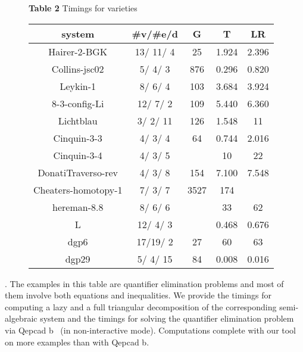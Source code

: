 \documentclass{sig-alternate}
\def\L {\ensuremath{\mathbb{L}}}
\begin{document}
\begin{figure}
\centering
{\textbf{Table 2} Timings for varieties}
\medskip
\newline
{\small
\begin{tabular}{c|c|c|c|c}
\hline
system                  &\#v/\#e/d& G            & T     & LR\\\hline
Hairer-2-BGK            & 13/ 11/ 4 & 25         &1.924  & 2.396\\Collins-jsc02           & 5/ 4/ 3   & 876        &0.296  & 0.820\\Leykin-1                & 8/ 6/ 4   & 103        &3.684  & 3.924\\8-3-config-Li           & 12/ 7/ 2  & 109        &5.440  & 6.360\\Lichtblau               & 3/ 2/ 11  & 126        &1.548  & 11\\Cinquin-3-3             & 4/ 3/ 4   & 64         &0.744  & 2.016\\Cinquin-3-4             & 4/ 3/ 5   &     &10     & 22\\DonatiTraverso-rev      & 4/ 3/ 8   & 154        &7.100  & 7.548\\Cheaters-homotopy-1     & 7/ 3/ 7   & 3527       &174    &  \\hereman-8.8             & 8/ 6/ 6   &     &33     & 62\\L                       &12/ 4/ 3   &      & 0.468 & 0.676\\
dgp6                    &17/19/ 2   & 27         & 60    & 63\\
dgp29                   & 5/ 4/ 15  & 84         & 0.008 & 0.016\\
\hline
\end{tabular}
}
\end{figure}

\smallskip{}.
The examples in this table 
are quantifier elimination problems
and most of them
involve both equations and inequalities.
We provide
the timings for computing a lazy and a full
triangular decomposition of the 
corresponding semi-algebraic system
and the timings for solving the quantifier
elimination problem via {\sc Qepcad b}~\cite{Bro03} 
(in non-interactive mode).
Computations complete with our tool on 
more examples than with {\sc Qepcad b}.
\end{document}
